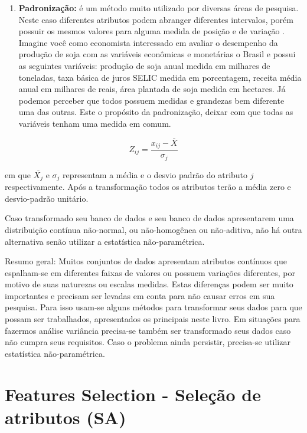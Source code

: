 \documentclass[
]{book}
\providecommand{\tightlist}{%
  \setlength{\itemsep}{0pt}\setlength{\parskip}{0pt}}
\begin{document}
\begin{enumerate}
\def\labelenumi{\arabic{enumi}.}
\setcounter{enumi}{4}
\tightlist
\item
  \textbf{Padronização:} é um método muito utilizado por diversas áreas de pesquisa. Neste caso diferentes atributos podem abranger diferentes intervalos, porém possuir os mesmos valores para alguma medida de posição e de variação \citep{carvalho2011inteligencia}. Imagine você como economista interessado em avaliar o desempenho da produção de soja com as variáveis econômicas e monetárias o Brasil e possui as seguintes variáveis: produção de soja anual medida em milhares de toneladas, taxa básica de juros SELIC medida em porcentagem, receita média anual em milhares de reais, área plantada de soja medida em hectares. Já podemos perceber que todos possuem medidas e grandezas bem diferente uma das outras. Este o propósito da padronização, deixar com que todas as variáveis tenham uma medida em comum.
\end{enumerate}

\begin{equation}
Z_{ij}=\frac{x_{ij}-\overline{X}}{\sigma_j}
\label{eq:padronizacao}
\end{equation}

em que \(\overline{X_j}\) e \(\sigma_j\) representam a média e o desvio padrão do atributo \(j\) respectivamente. Após a transformação todos os atributos terão a média zero e desvio-padrão unitário.

Caso transformado seu banco de dados e seu banco de dados apresentarem uma distribuição contínua não-normal, ou não-homogênea ou não-aditiva, não há outra alternativa senão utilizar a estatística não-paramétrica.

Resumo geral: Muitos conjuntos de dados apresentam atributos contínuos que espalham-se em diferentes faixas de valores ou possuem variações diferentes, por motivo de suas naturezas ou escalas medidas. Estas diferenças podem ser muito importantes e precisam ser levadas em conta para não causar erros em sua pesquisa. Para isso usam-se alguns métodos para transformar seus dados para que possam ser trabalhados, apresentados os principais neste livro. Em situações para fazermos análise variância precisa-se também ser transformado seus dados caso não cumpra seus requisitos. Caso o problema ainda persistir, precisa-se utilizar estatística não-paramétrica.

\hypertarget{features-selection---seleuxe7uxe3o-de-atributos-sa}{%
\section{Features Selection - Seleção de atributos (SA)}\label{features-selection---seleuxe7uxe3o-de-atributos-sa}}
\end{document}
